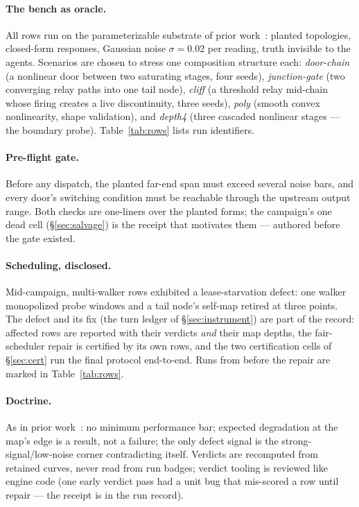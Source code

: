 \documentclass[11pt,a4paper]{article}
\begin{document}
\paragraph{The bench as oracle.}
All rows run on the parameterizable substrate of prior
work~\cite{p2}: planted topologies, closed-form responses, Gaussian
noise $\sigma{=}0.02$ per reading, truth invisible to the agents.
Scenarios are chosen to stress one composition structure each:
\emph{door-chain} (a nonlinear door between two saturating stages,
four seeds), \emph{junction-gate} (two converging relay paths into one
tail node), \emph{cliff} (a threshold relay mid-chain whose firing
creates a live discontinuity, three seeds), \emph{poly} (smooth convex
nonlinearity, shape validation), and \emph{depth4} (three cascaded
nonlinear stages --- the boundary probe). Table~\ref{tab:rows} lists
run identifiers.

\paragraph{Pre-flight gate.}
Before any dispatch, the planted far-end span must exceed several
noise bars, and every door's switching condition must be reachable
through the upstream output range. Both checks are one-liners over
the planted forms; the campaign's one dead cell (\S\ref{sec:salvage})
is the receipt that motivates them --- authored before the gate
existed.

\paragraph{Scheduling, disclosed.}
Mid-campaign, multi-walker rows exhibited a lease-starvation defect:
one walker monopolized probe windows and a tail node's self-map
retired at three points. The defect and its fix (the turn ledger of
\S\ref{sec:instrument}) are part of the record: affected rows are
reported with their verdicts \emph{and} their map depths, the
fair-scheduler repair is certified by its own rows, and the two
certification cells of \S\ref{sec:cert} run the final protocol
end-to-end. Runs from before the repair are marked in
Table~\ref{tab:rows}.

\paragraph{Doctrine.}
As in prior work~\cite{p2}: no minimum performance bar; expected
degradation at the map's edge is a result, not a failure; the only
defect signal is the strong-signal/low-noise corner contradicting
itself. Verdicts are recomputed from retained curves, never read from
run badges; verdict tooling is reviewed like engine code (one early
verdict pass had a unit bug that mis-scored a row until repair --- the
receipt is in the run record).
\end{document}

